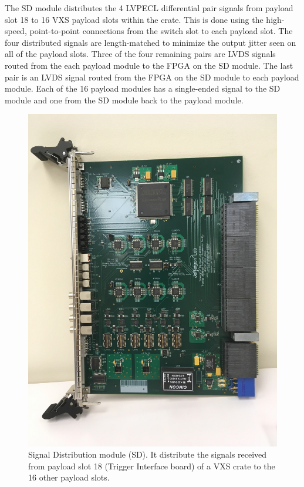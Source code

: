 The SD module distributes the 4 LVPECL differential pair  signals from payload slot 18 to 16 VXS payload slots within the crate. This is done using the high-speed, point-to-point connections from the switch slot to each payload slot. The four distributed signals are length-matched to minimize the output jitter seen on all of the payload slots. Three of the four remaining pairs are LVDS signals routed from the each payload module to the FPGA on the SD module. The last pair is an LVDS signal routed from the FPGA on the SD module to each payload module. Each of the 16 payload modules has a single-ended signal to the SD module and one from the SD module back to the payload module.

\begin{figure}[hbt]
	\centering
	\includegraphics[width=1.0\columnwidth,keepaspectratio]{img/sd_board.jpg}
	\caption{Signal Distribution module (SD). It distribute the signals received from payload slot 18 (Trigger Interface board) of a VXS crate to the 16 other payload slots.}
	\label{fig:SDpic}
\end{figure}


